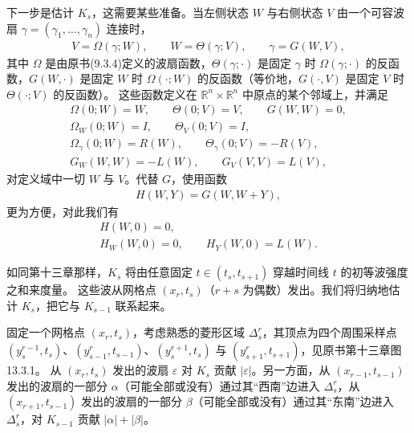 ﻿\documentclass[../../main.tex]{subfiles}
\begin{document}
下一步是估计 $K_s$，这需要某些准备。当左侧状态 $W$ 与右侧状态 $V$ 由一个可容波扇 $\gamma=(\gamma_1,\ldots,\gamma_n)$ 连接时，
\begin{align}
V=\Omega(\gamma;W),\qquad W=\Theta(\gamma;V),\qquad\gamma=G(W,V),
\label{align:ch16-s04-e20}
\end{align}
其中 $\Omega$ 是由原书(9.3.4)定义的波扇函数，$\Theta(\gamma;\cdot)$ 是固定 $\gamma$ 时 $\Omega(\gamma;\cdot)$ 的反函数，$G(W,\cdot)$ 是固定 $W$ 时 $\Omega(\cdot;W)$ 的反函数（等价地，$G(\cdot,V)$ 是固定 $V$ 时 $\Theta(\cdot;V)$ 的反函数）。
这些函数定义在 $\mathbb{R}^n\times\mathbb{R}^n$ 中原点的某个邻域上，并满足
\begin{align}
\Omega(0;W)=W,\qquad\Theta(0;V)=V,\qquad G(W,W)=0,
\label{align:ch16-s04-e21}\\
\Omega_W(0;W)=I,\qquad\Theta_V(0;V)=I,
\label{align:ch16-s04-e22}\\
\Omega_\gamma(0;W)=R(W),\qquad\Theta_\gamma(0;V)=-R(V),
\label{align:ch16-s04-e23}\\
G_W(W,W)=-L(W),\qquad G_V(V,V)=L(V),
\label{align:ch16-s04-e24}
\end{align}
对定义域中一切 $W$ 与 $V$。代替 $G$，使用函数
\begin{align}
H(W,Y)=G(W,W+Y),
\label{align:ch16-s04-e25}
\end{align}
更为方便，对此我们有
\begin{align}
H(W,0)=0,
\label{align:ch16-s04-e26}\\
H_W(W,0)=0,\qquad H_Y(W,0)=L(W).
\label{align:ch16-s04-e27}
\end{align}

如同第十三章那样，$K_s$ 将由任意固定 $t\in(t_s,t_{s+1})$ 穿越时间线 $t$ 的初等波强度之和来度量。
这些波从网格点 $(x_r,t_s)$（$r+s$ 为偶数）发出。我们将归纳地估计 $K_s$，把它与 $K_{s-1}$ 联系起来。

固定一个网格点 $(x_r,t_s)$，考虑熟悉的菱形区域 $\Delta_s^r$，其顶点为四个周围采样点 $(y_s^{r-1},t_s)$、$(y_{s-1}^r,t_{s-1})$、$(y_s^{r+1},t_s)$ 与 $(y_{s+1}^r,t_{s+1})$，见原书第十三章图 13.3.1。
从 $(x_r,t_s)$ 发出的波扇 $\varepsilon$ 对 $K_s$ 贡献 $|\varepsilon|$。另一方面，从 $(x_{r-1},t_{s-1})$ 发出的波扇的一部分 $\alpha$（可能全部或没有）通过其“西南”边进入 $\Delta_s^r$，从 $(x_{r+1},t_{s-1})$ 发出的波扇的一部分 $\beta$（可能全部或没有）通过其“东南”边进入 $\Delta_s^r$，对 $K_{s-1}$ 贡献 $|\alpha|+|\beta|$。
\end{document}
